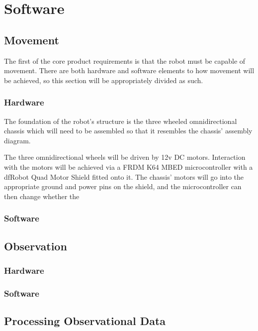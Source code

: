 			
	
	
	
	\section{Software}
	
		\subsection{Movement}
		The first of the core product requirements is that the robot must be capable of movement. There are both hardware and software elements to how movement will be achieved, so this section will be appropriately divided as such.
		
			\subsubsection{Hardware}	
			The foundation of the robot's structure is the three wheeled omnidirectional chassis which will need to be assembled so that it resembles the chassis' assembly diagram.
			
			 The three omnidirectional wheels will be driven by 12v DC motors. Interaction with the motors will be achieved via a FRDM K64 MBED microcontroller with a dfRobot Quad Motor Shield fitted onto it. The chassis' motors will go into the appropriate ground and power pins on the shield, and the microcontroller can then change whether the 
			
			\subsubsection{Software}
		
		
		\subsection{Observation}
			\subsubsection{Hardware}
			\subsubsection{Software}
		
		\subsection{Processing Observational Data}
		
